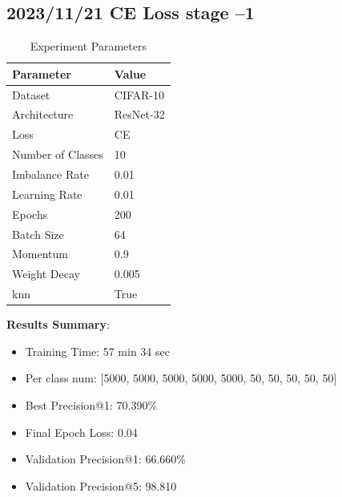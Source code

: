 \documentclass{article}
\begin{document}
\begin{multicols}{2} %
\section{2023/11/21 CE Loss stage --1}
\begin{table}[H]
\centering
\caption{Experiment Parameters}
\label{tab:parameters}
\begin{tabular}{ll}
\toprule
Parameter & Value \\
\midrule
Dataset & CIFAR-10 \\
Architecture & ResNet-32 \\
Loss & CE \\
Number of Classes & 10 \\
Imbalance Rate & 0.01 \\
Learning Rate & 0.01 \\
Epochs & 200 \\
Batch Size & 64 \\
Momentum & 0.9 \\
Weight Decay & 0.005 \\
knn & True \\
\bottomrule
\end{tabular}
\end{table}

\textbf{Results Summary}:
\begin{itemize}
    \item Training Time: 57 min 34 sec
    \item Per class num: [5000, 5000, 5000, 5000, 5000, 50, 50, 50, 50, 50]
    \item Best Precision@1: 70.390\%  
    \item Final Epoch Loss: 0.04 
    \item Validation Precision@1: 66.660\%
    \item Validation Precision@5: 98.810%
\end{itemize}


\end{multicols}
\end{document}
